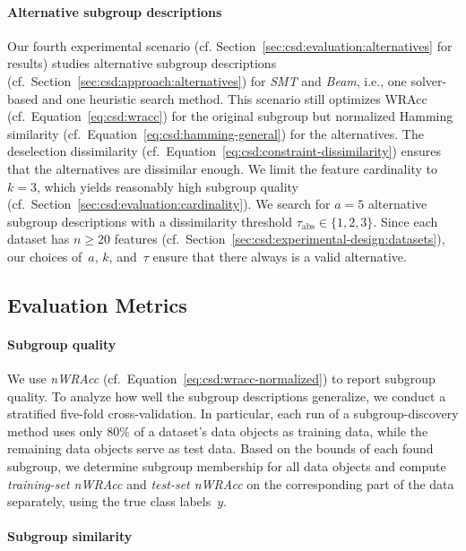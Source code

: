 \documentclass{article}
\theoremstyle{definition}
\begin{document}
\paragraph{Alternative subgroup descriptions}

Our fourth experimental scenario (cf. Section~\ref{sec:csd:evaluation:alternatives} for results) studies alternative subgroup descriptions (cf.~Section~\ref{sec:csd:approach:alternatives}) for \emph{SMT} and \emph{Beam}, i.e., one solver-based and one heuristic search method.
This scenario still optimizes WRAcc (cf.~Equation~\ref{eq:csd:wracc}) for the original subgroup but normalized Hamming similarity (cf.~Equation~\ref{eq:csd:hamming-general}) for the alternatives.
The deselection dissimilarity (cf.~Equation~\ref{eq:csd:constraint-dissimilarity}) ensures that the alternatives are dissimilar enough.
We limit the feature cardinality to~$k=3$, which yields reasonably high subgroup quality (cf.~Section~\ref{sec:csd:evaluation:cardinality}).
We search for $a=5$ alternative subgroup descriptions with a dissimilarity threshold $\tau_{\text{abs}} \in \{1, 2, 3\}$.
Since each dataset has $n \geq 20$ features (cf.~Section~\ref{sec:csd:experimental-design:datasets}), our choices of~$a$, $k$, and~$\tau$ ensure that there always is a valid alternative.

\subsection{Evaluation Metrics}
\label{sec:csd:experimental-design:metrics}

\paragraph{Subgroup quality}

We use \emph{nWRAcc} (cf.~Equation~\ref{eq:csd:wracc-normalized}) to report subgroup quality.
To analyze how well the subgroup descriptions generalize, we conduct a stratified five-fold cross-validation.
In particular, each run of a subgroup-discovery method uses only 80\% of a dataset's data objects as training data, while the remaining data objects serve as test data.
Based on the bounds of each found subgroup, we determine subgroup membership for all data objects and compute \emph{training-set nWRAcc} and \emph{test-set nWRAcc} on the corresponding part of the data separately, using the true class labels~$y$.

\paragraph{Subgroup similarity}
\end{document}
